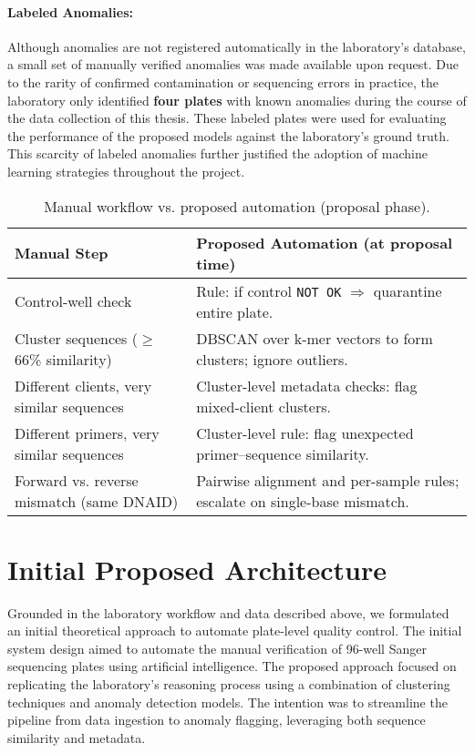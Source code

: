 \paragraph{Labeled Anomalies:} Although anomalies are not registered automatically in the laboratory's database, a small set of manually verified anomalies was made available upon request. Due to the rarity of confirmed contamination or sequencing errors in practice, the laboratory only identified \textbf{four plates} with known anomalies during the course of the data collection of this thesis. These labeled plates were used for evaluating the performance of the proposed models against the laboratory’s ground truth. This scarcity of labeled anomalies further justified the adoption of machine learning strategies throughout the project.

\begin{table}[H]
\centering
\caption{Manual workflow vs. proposed automation (proposal phase).}
\label{tab:manual_to_auto}
\begin{tabular}{|p{5.2cm}|p{9cm}|}
\hline
\textbf{Manual Step} & \textbf{Proposed Automation (at proposal time)} \\ \hline
Control-well check & Rule: if control \texttt{NOT OK} $\Rightarrow$ quarantine entire plate. \\ \hline
Cluster sequences ($\geq$66\% similarity) & DBSCAN over k-mer vectors to form clusters; ignore outliers. \\ \hline
Different clients, very similar sequences & Cluster-level metadata checks: flag mixed-client clusters. \\ \hline
Different primers, very similar sequences & Cluster-level rule: flag unexpected primer–sequence similarity. \\ \hline
Forward vs. reverse mismatch (same DNAID) & Pairwise alignment and per-sample rules; escalate on single-base mismatch. \\ \hline
\end{tabular}
\end{table}

\section{Initial Proposed Architecture}
\label{sec:initial_architecture}

Grounded in the laboratory workflow and data described above, we formulated an initial theoretical approach to automate plate-level quality control. The initial system design aimed to automate the manual verification of 96-well Sanger sequencing plates using artificial intelligence. The proposed approach focused on replicating the laboratory’s reasoning process using a combination of clustering techniques and anomaly detection models. The intention was to streamline the pipeline from data ingestion to anomaly flagging, leveraging both sequence similarity and metadata.

